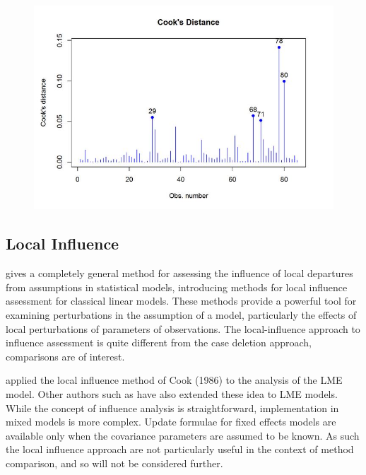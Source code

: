 \documentclass[12pt, a4paper]{report}
\theoremstyle{definition}
\theoremstyle{remark}
\begin{document}
\begin{figure}[h!]
\centering
\includegraphics[width=0.9\linewidth]{images/CooksDistancePlot-JS-Roy}
\caption{}
\label{fig:CooksDistancePlot-JS-Roy}
\end{figure}
%



\subsection{Local Influence}
\citet{cook86} gives a completely general method for assessing the influence of local departures from assumptions in statistical models, introducing methods for local influence assessment for classical linear models. These methods provide a powerful tool for examining perturbations in the assumption of a model, particularly the effects of local perturbations of parameters of observations. The local-influence approach to influence assessment is quite different from the case deletion approach, comparisons are of interest.

\citet{Beckman} applied the local influence method of Cook (1986) to the analysis of the LME model.  Other authors such as \citet{lesaffre1998local} have also extended these idea to LME models. 
While the concept of influence analysis is straightforward, implementation in mixed models is more complex. Update formulae for fixed effects models are available only when the covariance parameters are assumed to be known. As such the local influence approach are not particularly useful in the context of method comparison, and so will not be considered further.
\end{document}
